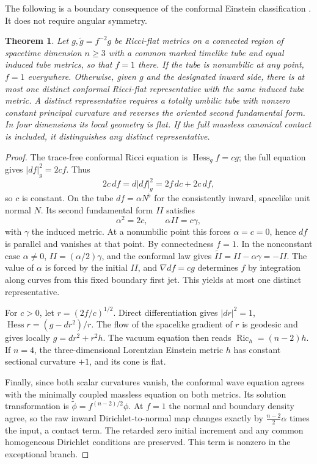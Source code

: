 \documentclass[11pt]{article}
\newtheorem{theorem}{Theorem}
\newcommand{\Ric}{\operatorname{Ric}}
\newcommand{\Hess}{\operatorname{Hess}}
\begin{document}
The following is a boundary consequence of the conformal Einstein classification \cite{Brinkmann}. It does not require angular symmetry.

\begin{theorem}\label{thm:conf}
Let \(g,\widetilde g=f^{-2}g\) be Ricci-flat metrics on a connected region of spacetime dimension \(n\ge3\) with a common marked timelike tube and equal induced tube metrics, so that \(f=1\) there. If the tube is nonumbilic at any point, \(f=1\) everywhere. Otherwise, given \(g\) and the designated inward side, there is at most one distinct conformal Ricci-flat representative with the same induced tube metric. A distinct representative requires a totally umbilic tube with nonzero constant principal curvature and reverses the oriented second fundamental form. In four dimensions its local geometry is flat. If the full massless canonical contact is included, it distinguishes any distinct representative.
\end{theorem}
\begin{proof}
The trace-free conformal Ricci equation is \(\Hess_g f=cg\); the full equation gives \(|df|_g^2=2cf\). Thus
\[
 2c\,df=d|df|_g^2=2f\,dc+2c\,df,
\]
so \(c\) is constant. On the tube \(df=\alpha N^\flat\) for the consistently inward, spacelike unit normal \(N\). Its second fundamental form \(II\) satisfies
\[
 \alpha^2=2c,\qquad
 \alpha II=c\gamma ,
\]
with \(\gamma\) the induced metric. At a nonumbilic point this forces \(\alpha=c=0\), hence \(df\) is parallel and vanishes at that point. By connectedness \(f=1\). In the nonconstant case \(\alpha\ne0\), \(II=(\alpha/2)\gamma\), and the conformal law gives \(\widetilde{II}=II-\alpha\gamma=-II\). The value of \(\alpha\) is forced by the initial \(II\), and \(\nabla df=cg\) determines \(f\) by integration along curves from this fixed boundary first jet. This yields at most one distinct representative.

For \(c>0\), let \(r=(2f/c)^{1/2}\). Direct differentiation gives \(|dr|^2=1\), \(\Hess r=(g-dr^2)/r\). The flow of the spacelike gradient of \(r\) is geodesic and gives locally \(g=dr^2+r^2h\). The vacuum equation then reads \(\Ric_h=(n-2)h\). If \(n=4\), the three-dimensional Lorentzian Einstein metric \(h\) has constant sectional curvature \(+1\), and its cone is flat.

Finally, since both scalar curvatures vanish, the conformal wave equation agrees with the minimally coupled massless equation on both metrics. Its solution transformation is \(\widetilde\phi=f^{(n-2)/2}\phi\). At \(f=1\) the normal and boundary density agree, so the raw inward Dirichlet-to-normal map changes exactly by \(\tfrac{n-2}{2}\alpha\) times the input, a contact term. The retarded zero initial increment and any common homogeneous Dirichlet conditions are preserved. This term is nonzero in the exceptional branch.
\end{proof}
\end{document}
